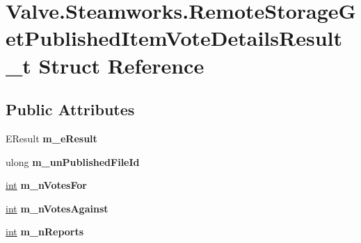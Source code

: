 \hypertarget{structValve_1_1Steamworks_1_1RemoteStorageGetPublishedItemVoteDetailsResult__t}{}\section{Valve.\+Steamworks.\+Remote\+Storage\+Get\+Published\+Item\+Vote\+Details\+Result\+\_\+t Struct Reference}
\label{structValve_1_1Steamworks_1_1RemoteStorageGetPublishedItemVoteDetailsResult__t}
\subsection*{Public Attributes}
\begin{DoxyCompactItemize}
\item 
\hypertarget{structValve_1_1Steamworks_1_1RemoteStorageGetPublishedItemVoteDetailsResult__t_adfb240eefb4e9275ca3381d922026c10}{}E\+Result {\bfseries m\+\_\+e\+Result}\label{structValve_1_1Steamworks_1_1RemoteStorageGetPublishedItemVoteDetailsResult__t_adfb240eefb4e9275ca3381d922026c10}

\item 
\hypertarget{structValve_1_1Steamworks_1_1RemoteStorageGetPublishedItemVoteDetailsResult__t_a63fead35f5c9bcae808de7c2c3ecc20a}{}ulong {\bfseries m\+\_\+un\+Published\+File\+Id}\label{structValve_1_1Steamworks_1_1RemoteStorageGetPublishedItemVoteDetailsResult__t_a63fead35f5c9bcae808de7c2c3ecc20a}

\item 
\hypertarget{structValve_1_1Steamworks_1_1RemoteStorageGetPublishedItemVoteDetailsResult__t_a5644dd41e96093105db6e7f73def85f0}{}\hyperlink{SDL__thread_8h_a6a64f9be4433e4de6e2f2f548cf3c08e}{int} {\bfseries m\+\_\+n\+Votes\+For}\label{structValve_1_1Steamworks_1_1RemoteStorageGetPublishedItemVoteDetailsResult__t_a5644dd41e96093105db6e7f73def85f0}

\item 
\hypertarget{structValve_1_1Steamworks_1_1RemoteStorageGetPublishedItemVoteDetailsResult__t_a619c435958c95917b0bd2f90f97998d7}{}\hyperlink{SDL__thread_8h_a6a64f9be4433e4de6e2f2f548cf3c08e}{int} {\bfseries m\+\_\+n\+Votes\+Against}\label{structValve_1_1Steamworks_1_1RemoteStorageGetPublishedItemVoteDetailsResult__t_a619c435958c95917b0bd2f90f97998d7}

\item 
\hypertarget{structValve_1_1Steamworks_1_1RemoteStorageGetPublishedItemVoteDetailsResult__t_a1ea06acbeb6f96e788ea6ebc64311b0c}{}\hyperlink{SDL__thread_8h_a6a64f9be4433e4de6e2f2f548cf3c08e}{int} {\bfseries m\+\_\+n\+Reports}\label{structValve_1_1Steamworks_1_1RemoteStorageGetPublishedItemVoteDetailsResult__t_a1ea06acbeb6f96e788ea6ebc64311b0c}


\end{DoxyCompactItemize}
